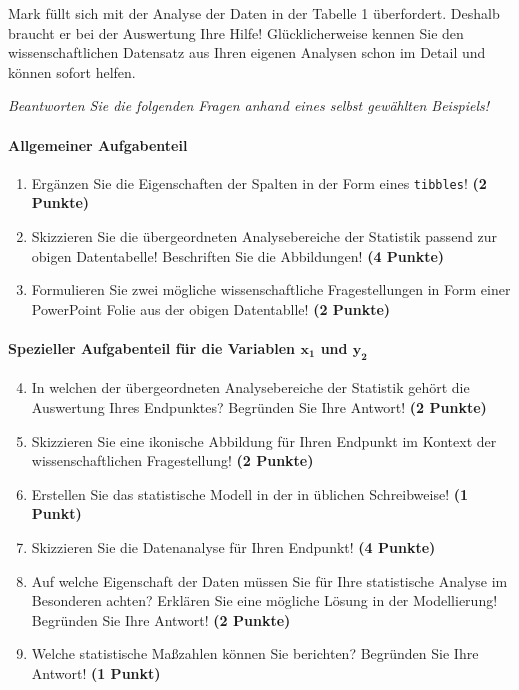 \documentclass[a4paper, 9pt]{scrartcl}\usepackage[]{graphicx}\usepackage[]{xcolor}
\begin{document}
Mark füllt sich mit der Analyse der Daten in der Tabelle 1 überfordert. Deshalb braucht er bei der Auswertung Ihre Hilfe! Glücklicherweise kennen Sie den wissenschaftlichen Datensatz aus Ihren eigenen Analysen schon im Detail und können sofort helfen.

\begin{graybox}{}
\begin{center}
\textit{Beantworten Sie die folgenden Fragen anhand eines selbst gewählten Beispiels!}
\end{center}
\end{graybox}

\paragraph{Allgemeiner Aufgabenteil} 

\begin{enumerate}
  \setcounter{enumi}{0}
  \item Ergänzen Sie die Eigenschaften der Spalten in der Form eines \texttt{tibbles}! \textbf{(2 Punkte)}
  \item Skizzieren Sie die übergeordneten Analysebereiche der Statistik passend zur obigen Datentabelle! Beschriften Sie die Abbildungen! \textbf{(4 Punkte)}
  \item Formulieren Sie zwei mögliche wissenschaftliche Fragestellungen in Form einer PowerPoint Folie aus der obigen Datentablle! \textbf{(2 Punkte)}
\end{enumerate}

\paragraph{Spezieller Aufgabenteil für die Variablen $\boldsymbol{x_1}$ und $\boldsymbol{y_2}$}

\begin{enumerate}
  \setcounter{enumi}{3}
  \item In welchen der übergeordneten Analysebereiche der Statistik gehört die Auswertung Ihres Endpunktes? Begründen Sie Ihre Antwort! \textbf{(2 Punkte)}
  \item Skizzieren Sie eine ikonische Abbildung für Ihren Endpunkt im Kontext der wissenschaftlichen Fragestellung! \textbf{(2 Punkte)}
  \item Erstellen Sie das statistische Modell in der in \Rlogo üblichen Schreibweise! \textbf{(1 Punkt)}
  \item Skizzieren Sie die Datenanalyse für Ihren Endpunkt! \textbf{(4 Punkte)}
  \item Auf welche Eigenschaft der Daten müssen Sie für Ihre statistische Analyse im Besonderen achten? Erklären Sie eine mögliche Lösung in der Modellierung! Begründen Sie Ihre Antwort! \textbf{(2 Punkte)}
  \item Welche statistische Maßzahlen können Sie berichten? Begründen Sie Ihre Antwort! \textbf{(1 Punkt)}
\end{enumerate}
\end{document}
